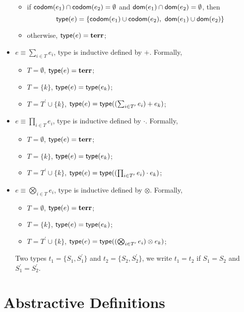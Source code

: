 \begin{definition}
\begin{itemize}
\begin{itemize}
            \item if ${\mathsf{codom}\!\left(e_1\right)}\cap {\mathsf{codom}\!\left(e_2\right)} = \emptyset$ and ${\mathsf{dom}\!\left(e_1\right)}\cap {\mathsf{dom}\!\left(e_2\right)} = \emptyset$, then 
            $${\textsf{type}}(e) = \{{\mathsf{codom}\!\left(e_1\right)}\cup {\mathsf{codom}\!\left(e_2\right)},\  {\mathsf{dom}\!\left(e_1\right)}\cup {\mathsf{dom}\!\left(e_2\right)}\}$$
            \item otherwise, ${\textsf{type}}(e) = {\mathbf{terr}}$;
        \end{itemize}
        \item $e\equiv\sum_{i\in T} e_i$,  type is inductive defined by $+$. Formally,
        \begin{itemize}
            \item $T = \emptyset$, ${\textsf{type}}(e) = {\mathbf{terr}}$;
            \item $T = \{k\}$, ${\textsf{type}}(e) = {\textsf{type}}(e_k)$;
            \item $T = T^\prime\cup\{k\}$, ${\textsf{type}}(e) = {\textsf{type}}((\sum_{i\in T^\prime}e_i) + e_k)$;
        \end{itemize}
        \item $e\equiv\prod_{i\in T} e_i$,  type is inductive defined by $\cdot$. Formally,
        \begin{itemize}
            \item $T = \emptyset$, ${\textsf{type}}(e) = {\mathbf{terr}}$;
            \item $T = \{k\}$, ${\textsf{type}}(e) = {\textsf{type}}(e_k)$;
            \item $T = T^\prime\cup\{k\}$, ${\textsf{type}}(e) = {\textsf{type}}((\prod_{i\in T^\prime}e_i) \cdot e_k)$;
        \end{itemize}
        \item $e\equiv\bigotimes_{i\in T} e_i$,  type is inductive defined by $\otimes$. Formally,
        \begin{itemize}
            \item $T = \emptyset$, ${\textsf{type}}(e) = {\mathbf{terr}}$;
            \item $T = \{k\}$, ${\textsf{type}}(e) = {\textsf{type}}(e_k)$;
            \item $T = T^\prime\cup\{k\}$, ${\textsf{type}}(e) = {\textsf{type}}((\bigotimes_{i\in T^\prime}e_i) \otimes e_k)$;
        \end{itemize}
        Two types $t_1=\{S_1,S_1^\prime\}$ and $t_2=\{S_2,S_2^\prime\}$, we write $t_1 = t_2$ if $S_1 = S_2$ and $S_1^\prime = S_2^\prime$.
    \end{itemize}
    
\end{definition}
    


\section{Abstractive Definitions}
\label{sec abs def}

